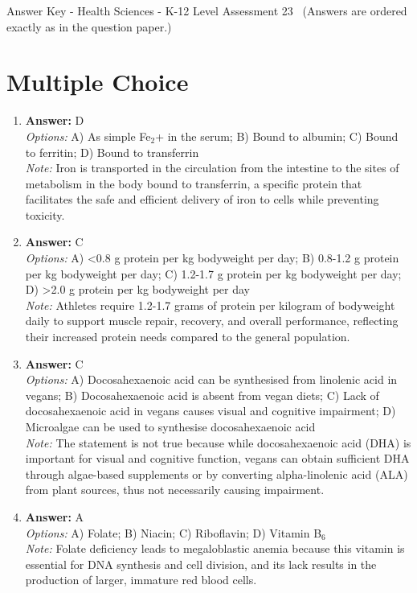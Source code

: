 \documentclass[12pt]{article}
\begin{document}
\begin{center}
Answer Key - Health Sciences - K-12 Level Assessment 23 \
\small (Answers are ordered exactly as in the question paper.)
\end{center}

\section*{Multiple Choice}
\begin{enumerate}[label=\arabic*.]
\item \textbf{Answer:} D
\\ \textit{Options:} A) As simple Fe$_{2}$+ in the serum; B) Bound to albumin; C) Bound to ferritin; D) Bound to transferrin
\\ \textit{Note:} Iron is transported in the circulation from the intestine to the sites of metabolism in the body bound to transferrin, a specific protein that facilitates the safe and efficient delivery of iron to cells while preventing toxicity.
\item \textbf{Answer:} C
\\ \textit{Options:} A) \textless{}0.8 g protein per kg bodyweight per day; B) 0.8-1.2 g protein per kg bodyweight per day; C) 1.2-1.7 g protein per kg bodyweight per day; D) \textgreater{}2.0 g protein per kg bodyweight per day
\\ \textit{Note:} Athletes require 1.2-1.7 grams of protein per kilogram of bodyweight daily to support muscle repair, recovery, and overall performance, reflecting their increased protein needs compared to the general population.
\item \textbf{Answer:} C
\\ \textit{Options:} A) Docosahexaenoic acid can be synthesised from linolenic acid in vegans; B) Docosahexaenoic acid is absent from vegan diets; C) Lack of docosahexaenoic acid in vegans causes visual and cognitive impairment; D) Microalgae can be used to synthesise docosahexaenoic acid
\\ \textit{Note:} The statement is not true because while docosahexaenoic acid (DHA) is important for visual and cognitive function, vegans can obtain sufficient DHA through algae-based supplements or by converting alpha-linolenic acid (ALA) from plant sources, thus not necessarily causing impairment.
\item \textbf{Answer:} A
\\ \textit{Options:} A) Folate; B) Niacin; C) Riboflavin; D) Vitamin B$_{6}$
\\ \textit{Note:} Folate deficiency leads to megaloblastic anemia because this vitamin is essential for DNA synthesis and cell division, and its lack results in the production of larger, immature red blood cells.

\end{enumerate}
\end{document}
